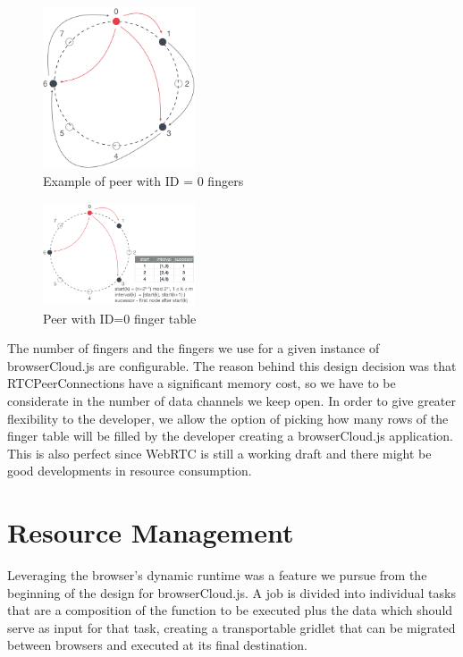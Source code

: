 \begin{figure}[h!]
  \centering
  \includegraphics[width=0.4\textwidth]{figs/chord-5}
  \caption{Example of peer with ID = 0 fingers}
  \label{fig:c-5}
\end{figure}

\begin{figure}[h!]
  \centering
  \includegraphics[width=0.4\textwidth]{figs/chord-6}
  \caption{Peer with ID=0 finger table}
  \label{fig:c-6}
\end{figure}

The number of fingers and the fingers we use for a given instance of browserCloud.js are configurable. The reason behind this design decision was that RTCPeerConnections have a significant memory cost, so we have to be considerate in the number of data channels we keep open. In order to give greater flexibility to the developer, we allow the option of picking how many rows of the finger table will be filled by the developer creating a browserCloud.js application. This is also perfect since WebRTC is still a working draft and there might be good developments in resource consumption.

\section{Resource Management}

Leveraging the browser's dynamic runtime was a feature we pursue from the beginning of the design for browserCloud.js. A job is divided into individual tasks that are a composition of the function to be executed plus the data which should serve as input for that task, creating a transportable gridlet that can be migrated between browsers and executed at its final destination.

